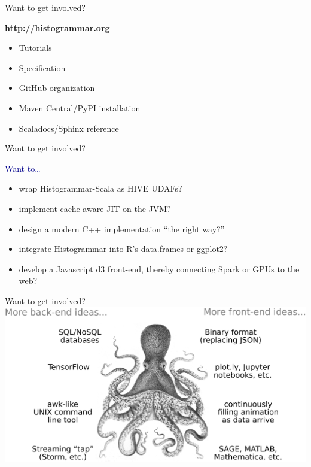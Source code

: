 \documentclass[aspectratio=169]{beamer}
\begin{document}
\begin{frame}{Want to get involved?}
\begin{center}
\begin{minipage}{0.55\linewidth}
\Large
\textcolor{blue}{\textbf{\url{http://histogrammar.org}}}

\begin{itemize}
\item Tutorials
\item Specification
\item GitHub organization
\item Maven Central/PyPI installation
\item Scaladocs/Sphinx reference
\end{itemize}
\end{minipage}
\end{center}
\end{frame}

\begin{frame}{Want to get involved?}
\begin{center}
\begin{minipage}{0.9\linewidth}
\Large
\textcolor{darkblue}{Want to\ldots}
\begin{itemize}\setlength{\itemsep}{0.35 cm}
\item wrap Histogrammar-Scala as HIVE UDAFs?
\item implement cache-aware JIT on the JVM?
\item design a modern C++ implementation ``the right way?''
\item integrate Histogrammar into R's data.frames or ggplot2?
\item develop a Javascript d3 front-end, thereby connecting Spark or GPUs to the web?
\end{itemize}
\end{minipage}
\end{center}
\end{frame}

\begin{frame}{Want to get involved?}
\vspace{0.5 cm}
\includegraphics[width=\linewidth]{octopus_ending.pdf}
\end{frame}
\end{document}
